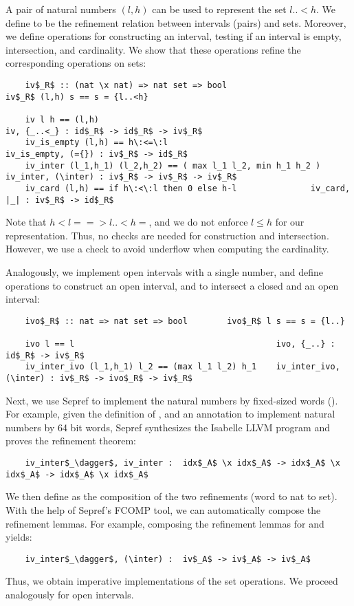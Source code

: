 \documentclass[sn-mathphys,Numbered]{sn-jnl}
\theoremstyle{thmstyleone}%
\theoremstyle{definition}%
\theoremstyle{thmstylethree}%
\begin{document}
  A pair of natural numbers \is$(l,h)$ can be used to represent the set \is${l..<h}$. We define  to be
  the refinement relation between intervals (pairs) and sets.
  Moreover, we define operations for constructing an interval, testing if an interval is empty, intersection, and cardinality.
  We show that these operations refine the corresponding operations on sets:
  \begin{lstlisting}
    iv$_R$ :: (nat \x nat) => nat set => bool                    iv$_R$ (l,h) s == s = {l..<h}

    iv l h == (l,h)                                                 iv, {_..<_} : id$_R$ -> id$_R$ -> iv$_R$
    iv_is_empty (l,h) == h\:<=\:l                                   iv_is_empty, (={}) : iv$_R$ -> id$_R$
    iv_inter (l_1,h_1) (l_2,h_2) == ( max l_1 l_2, min h_1 h_2 )     iv_inter, (\inter) : iv$_R$ -> iv$_R$ -> iv$_R$
    iv_card (l,h) == if h\:<\:l then 0 else h-l               iv_card, |_| : iv$_R$ -> id$_R$
  \end{lstlisting}
  Note that \is$h<l ==> {l..<h} = {}$, and we do not enforce $l\le h$ for our representation. Thus, no checks are needed for construction and intersection.
  However, we use a check to avoid underflow when computing the cardinality.

  Analogously, we implement open intervals with a single number, and define operations to construct an open interval,
  and to intersect a closed and an open interval:
  \begin{lstlisting}
    ivo$_R$ :: nat => nat set => bool        ivo$_R$ l s == s = {l..}

    ivo l == l                                         ivo, {_..} : id$_R$ -> iv$_R$
    iv_inter_ivo (l_1,h_1) l_2 == (max l_1 l_2) h_1    iv_inter_ivo, (\inter) : iv$_R$ -> ivo$_R$ -> iv$_R$
  \end{lstlisting}

  Next, we use Sepref to implement the natural numbers by fixed-sized words ().
  For example, given the definition of , and an annotation to implement natural numbers by 64 bit words,
  Sepref synthesizes the Isabelle LLVM program  and proves the refinement theorem:
  \begin{lstlisting}
    iv_inter$_\dagger$, iv_inter :  idx$_A$ \x idx$_A$ -> idx$_A$ \x idx$_A$ -> idx$_A$ \x idx$_A$
  \end{lstlisting}
  We then define  as the composition of the two refinements (word to nat to set).
  With the help of Sepref's FCOMP tool, we can automatically compose the refinement lemmas.
  For example, composing the refinement lemmas for  and  yields:
  \begin{lstlisting}
    iv_inter$_\dagger$, (\inter) :  iv$_A$ -> iv$_A$ -> iv$_A$
  \end{lstlisting}
  Thus, we obtain imperative implementations of the set operations. We proceed analogously for open intervals.
\end{document}
